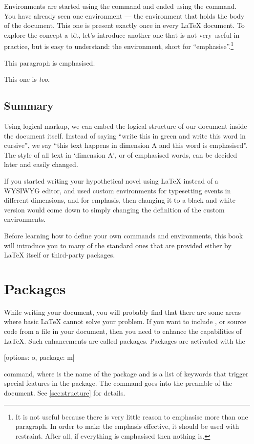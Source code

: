 Environments are started using the  command and ended using the
 command. You have already seen one environment --- the
 environment that holds the body of the document. This one is
present exactly once in every \LaTeX{} document. To explore the concept a bit,
let's introduce another one that is not very useful in practice, but is easy to
understand: the  environment, short for
\enquote{emphasise}.\footnote{It is not useful because there is very little
  reason to emphasise more than one paragraph. In order to make the emphasis
  effective, it should be used with restraint. After all, if everything is
  emphasised then nothing is.}
\begin{example}
\begin{em}
  This paragraph is emphasised.

  This one is \emph{too}.
\end{em}
\end{example}

\subsection{Summary}

Using logical markup, we can embed the logical structure of our document inside
the document itself. Instead of saying \enquote{write this in green and write
  this word in cursive}, we say \enquote{this text happens in dimension A and
  this word is emphasised}. The style of all text in \enquote*{dimension A},
or of emphasised words, can be decided later and easily changed.

If you started writing your hypothetical novel using \LaTeX{} instead of a
WYSIWYG editor, and used custom environments for typesetting events in different
dimensions, and  for emphasis, then changing it to a black and white
version would come down to simply changing the definition of the custom
environments.

Before learning how to define your own commands and environments, this book
will introduce you to many of the standard ones that are provided either by
\LaTeX{} itself or third-party packages.

\section{Packages} While writing your document, you will
probably find that there are some areas where basic \LaTeX{} cannot solve your
problem. If you want to include ,  or source
code from a file in your document, then you need to enhance the capabilities of
\LaTeX. Such enhancements are called packages. Packages are activated with the
\begin{lscommand}
  [options: o, package: m]
\end{lscommand}
command, where  is the name of the package and
 is a list of keywords that trigger special features in
the package. The  command goes into the preamble of the
document. See \autoref{sec:structure} for details.

